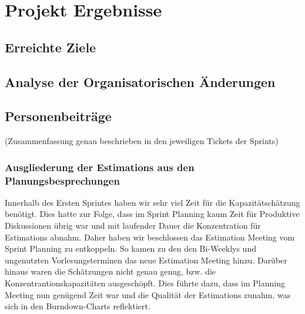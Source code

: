 
\chapter{Projekt Ergebnisse}

\section{Erreichte Ziele}

\section{Analyse der Organisatorischen Änderungen}
\section{Personenbeiträge}
(Zusammenfassung genau beschrieben in den jeweiligen Tickets der Sprints)

\subsection{Ausgliederung der Estimations aus den Planungsbesprechungen}

Innerhalb des Ersten Sprintes haben wir sehr viel Zeit für die Kapazitätschätzung benötigt. 
Dies hatte zur Folge, dass im Sprint Planning kaum Zeit für Produktive Diskussionen übrig war und mit laufender Dauer die Konzentration für Estimations abnahm.
Daher haben wir beschlossen das Estimation Meeting vom Sprint Planning zu entkoppeln. So kamen zu den den Bi-Weeklys und ungenutzten Vorlesungsterminen das neue Estimation Meeting hinzu.
Darüber hinaus waren die Schätzungen nicht genau genug, bzw. die Konzentrantionskapazitäten ausgeschöpft.
Dies führte dazu, dass im Planning Meeting nun genügend Zeit war und die Qualität der Estimations zunahm, was sich in den Burndown-Charts reflektiert.